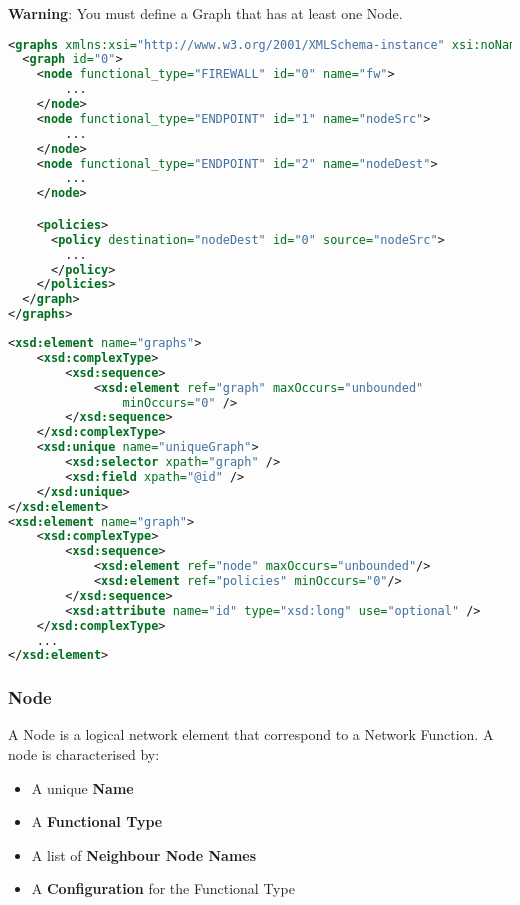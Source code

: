 \begin{warning}
\textbf{Warning}: You must define a Graph that has at least one Node.
\end{warning}

\begin{lstlisting}[language=XML, caption=Graphs Example]
<graphs xmlns:xsi="http://www.w3.org/2001/XMLSchema-instance" xsi:noNamespaceSchemaLocation="xml_components_v2.xsd">
  <graph id="0">
    <node functional_type="FIREWALL" id="0" name="fw">
        ...
    </node>
    <node functional_type="ENDPOINT" id="1" name="nodeSrc">
        ...
    </node>
    <node functional_type="ENDPOINT" id="2" name="nodeDest">
        ...
    </node>

    <policies>
      <policy destination="nodeDest" id="0" source="nodeSrc">
        ...
      </policy>
    </policies>
  </graph>
</graphs>
\end{lstlisting}

\begin{lstlisting}[language=XML, caption=Graphs schema code snippet]
<xsd:element name="graphs">
    <xsd:complexType>
        <xsd:sequence>
            <xsd:element ref="graph" maxOccurs="unbounded"
                minOccurs="0" />
        </xsd:sequence>
    </xsd:complexType>
    <xsd:unique name="uniqueGraph">
        <xsd:selector xpath="graph" />
        <xsd:field xpath="@id" />
    </xsd:unique>
</xsd:element>
<xsd:element name="graph">
    <xsd:complexType>
        <xsd:sequence>
            <xsd:element ref="node" maxOccurs="unbounded"/>
            <xsd:element ref="policies" minOccurs="0"/>
        </xsd:sequence>
        <xsd:attribute name="id" type="xsd:long" use="optional" />
    </xsd:complexType>
    ...
</xsd:element>
\end{lstlisting}

\subsubsection*{Node}
A Node is a logical network element that correspond to a Network Function. A node is characterised
by:
\begin{itemize}
 \item A unique \textbf{Name}
 \item A \textbf{Functional Type}
 \item A list of \textbf{Neighbour Node Names}
 \item A \textbf{Configuration} for the Functional Type
\end{itemize}



